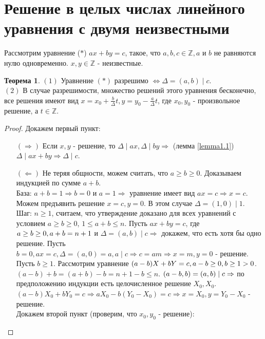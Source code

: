 \documentclass[a4paper, 12pt]{article}
\newcommand{\Z}{\mathbb{Z}}
\newcommand{\lra}{\Leftrightarrow}
\renewcommand{\div}{\mid}
\theoremstyle{definition}
\newtheorem{theorem}{Теорема}[section]
\begin{document}
    \section{Решение в целых числах линейного уравнения с двумя неизвестными}
    Рассмотрим уравнение ($*$) $ax+by=c$, такое, что $a,b,c\in \Z, a$ и $b$ не равняются нулю одновременно. $x,y\in \Z$ - неизвестные.
    \begin{theorem} \label{th4.1}
        $(1)$ Уравнение $(*)$ разрешимо $\lra \Delta = (a,b) \div c$.\\
        $(2)$ В случае разрешимости, множество решений этого уравнения бесконечно, все решения имеют вид $x=x_0+\frac{b}{\Delta}t, y=y_0-\frac{a}{\Delta}t$, где $x_0,y_0$ - произвольное решение, а $t\in \Z$.
    \end{theorem} 
    \begin{proof}
        Докажем первый пункт:
        \begin{itemize}
            \item[$(\Rightarrow)$] Если $x,y$ - решение, то $\Delta \div ax, \Delta \div by\Rightarrow$ (лемма \ref{lemma1.1}) $\Delta \div ax+by\Rightarrow \Delta \div c$.
            \item[$(\Leftarrow)$] Не теряя общности, можем считать, что $a\geq b\geq 0$. Доказываем индукцией по сумме $a+b$. \\
            База: $a+b=1\Rightarrow b=0$ и $a=1 \Rightarrow$ уравнение имеет вид $ax=c\Rightarrow x=c$. Можем предъявить решение $x=c, y=0$. В этом случае $\Delta = (1,0) \div 1$. \\
            Шаг: $n\geq 1$, считаем, что утверждение доказано для всех уравнений с условием $a\geq b\geq 0$, $1\leq a+b\leq n$. Пусть $ax+by=c$, где $a\geq b\geq 0,\\ a+b=n+1$ и $\Delta = (a,b) \div c \Rightarrow$ докажем, что есть хотя бы одно решение. Пусть $b=0, ax=c, \Delta = (a,0)=a, a\div c\Rightarrow c=am\Rightarrow x=m, y=0$ - решение. Пусть $b\geq 1$. Рассмотрим уравнение $(a-b)X+bY=c,\\ a-b\geq 0, b\geq 1 >0$. $(a-b)+b=(a+b)-b=n+1-b\leq n$. $(a-b, b)=(a,b) \div c\\ \Rightarrow$ по предположению индукции есть целочисленное решение $X_0,X_0$. \\ $(a-b)X_0+bY_0=c\Rightarrow aX_0-b(Y_0-X_0) = c \Rightarrow x=X_0, y=Y_0-X_0$ - решение.\\
            Докажем второй пункт (проверим, что $x_0,y_0$ - решение):\\

\end{itemize}
\end{proof}
\end{document}
